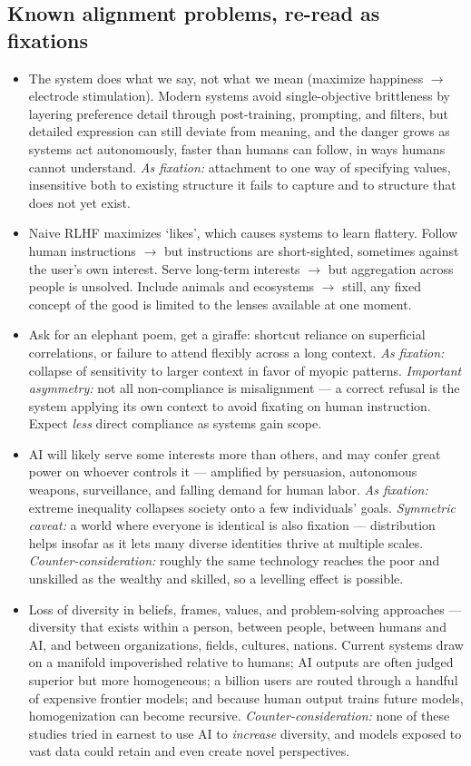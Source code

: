 \documentclass[11pt]{article}
\begin{document}
\subsection*{Known alignment problems, re-read as fixations}

\begin{itemize}
  \item The system does what we say, not what we mean (maximize happiness $\rightarrow$ electrode stimulation). Modern systems avoid single-objective brittleness by layering preference detail through post-training, prompting, and filters, but detailed expression can still deviate from meaning, and the danger grows as systems act autonomously, faster than humans can follow, in ways humans cannot understand. \textit{As fixation:} attachment to one way of specifying values, insensitive both to existing structure it fails to capture and to structure that does not yet exist.
  \item Naive RLHF maximizes `likes', which causes systems to learn flattery. Follow human instructions $\rightarrow$ but instructions are short-sighted, sometimes against the user's own interest. Serve long-term interests $\rightarrow$ but aggregation across people is unsolved. Include animals and ecosystems $\rightarrow$ still, any fixed concept of the good is limited to the lenses available at one moment.
  \item Ask for an elephant poem, get a giraffe: shortcut reliance on superficial correlations, or failure to attend flexibly across a long context. \textit{As fixation:} collapse of sensitivity to larger context in favor of myopic patterns. \textit{Important asymmetry:} not all non-compliance is misalignment --- a correct refusal is the system applying its own context to avoid fixating on human instruction. Expect \textit{less} direct compliance as systems gain scope.
  \item AI will likely serve some interests more than others, and may confer great power on whoever controls it --- amplified by persuasion, autonomous weapons, surveillance, and falling demand for human labor. \textit{As fixation:} extreme inequality collapses society onto a few individuals' goals. \textit{Symmetric caveat:} a world where everyone is identical is also fixation --- distribution helps insofar as it lets many diverse identities thrive at multiple scales. \textit{Counter-consideration:} roughly the same technology reaches the poor and unskilled as the wealthy and skilled, so a levelling effect is possible.
  \item Loss of diversity in beliefs, frames, values, and problem-solving approaches --- diversity that exists within a person, between people, between humans and AI, and between organizations, fields, cultures, nations. Current systems draw on a manifold impoverished relative to humans; AI outputs are often judged superior but more homogeneous; a billion users are routed through a handful of expensive frontier models; and because human output trains future models, homogenization can become recursive. \textit{Counter-consideration:} none of these studies tried in earnest to use AI to \textit{increase} diversity, and models exposed to vast data could retain and even create novel perspectives.

\end{itemize}
\end{document}
